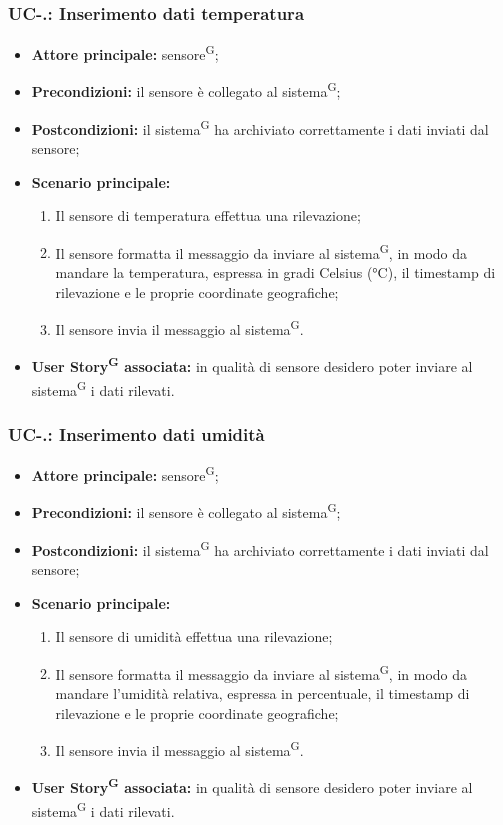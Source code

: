\documentclass[8pt]{article}
\newcommand{\glossterm}[1]{#1\textsuperscript{G}} %
\begin{document}
\subsubsection*{UC-\theuc .\speconenumber: Inserimento dati temperatura}
\begin{itemize}
    \item \textbf{Attore principale:} \glossterm{sensore};
    \item \textbf{Precondizioni:} il sensore è collegato al \glossterm{sistema};
    \item \textbf{Postcondizioni:} il \glossterm{sistema} ha archiviato correttamente i dati inviati dal sensore;
    \item \textbf{Scenario principale:}
        \begin{enumerate}
        \item Il sensore di temperatura effettua una rilevazione;
        \item Il sensore formatta il messaggio da inviare al \glossterm{sistema}, in modo da mandare la
temperatura, espressa in gradi Celsius (°C), il timestamp di rilevazione e le proprie
coordinate geografiche;
        \item Il sensore invia il messaggio al \glossterm{sistema}.
        \end{enumerate}
    \item \textbf{\glossterm{User Story} associata:} in qualità di sensore desidero poter inviare al \glossterm{sistema} i
        dati rilevati.
\end{itemize}
\subsubsection*{UC-\theuc .\speconenumber: Inserimento dati umidità}
\begin{itemize}
    \item \textbf{Attore principale:} \glossterm{sensore};
    \item \textbf{Precondizioni:} il sensore è collegato al \glossterm{sistema};
    \item \textbf{Postcondizioni:} il \glossterm{sistema} ha archiviato correttamente i dati inviati dal sensore;
    \item \textbf{Scenario principale:}
        \begin{enumerate}
        \item Il sensore di umidità effettua una rilevazione;
        \item Il sensore formatta il messaggio da inviare al \glossterm{sistema}, in modo da mandare l'umidità
            relativa, espressa in percentuale, il timestamp di rilevazione e le proprie
coordinate geografiche;
        \item Il sensore invia il messaggio al \glossterm{sistema}.
        \end{enumerate}
    \item \textbf{\glossterm{User Story} associata:} in qualità di sensore desidero poter inviare al \glossterm{sistema} i
        dati rilevati.
\end{itemize}
\end{document}
